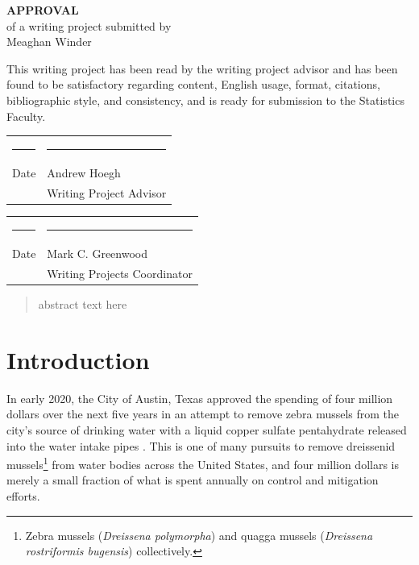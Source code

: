 \documentclass[12pt]{article}\usepackage[]{graphicx}\usepackage[]{color}
\begin{document}
\begin{titlepage}
\null
\begin{center}
{\bf\huge APPROVAL}\\[1.0 in]
of a writing project submitted by\\[.25 in]
Meaghan Winder \\[0.5 in]
\end{center}

\noindent
This writing project has been read by the writing project advisor and
has been found to be satisfactory regarding content, English usage,
format, citations, bibliographic style, and consistency, and is ready
for submission to the Statistics Faculty.

\vspace{.3in}
\begin{center}
\begin{tabular}{ll}
\rule{2.75in}{.03in} & \rule{2.75in}{.03in} \\
Date& Andrew Hoegh \\
& Writing Project Advisor \\
\end{tabular}
\end{center}

\vspace{1cm}

\begin{center}
\begin{tabular}{ll}
\rule{2.75in}{.03in} & \rule{2.75in}{.03in} \\
Date& Mark C. Greenwood \\
& Writing Projects Coordinator \\
\end{tabular}
\end{center}

\end{titlepage}

\newpage
\tableofcontents
\newpage

\begin{abstract}
\noindent abstract text here 
\end{abstract}

\doublespacing

\section{Introduction}

In early 2020, the City of Austin, Texas approved the spending of four million dollars over the next five years in an attempt to remove zebra mussels from the city's source of drinking water with a liquid copper sulfate pentahydrate released into the water intake pipes \cite{CBS:Austin}. This is one of many pursuits to remove dreissenid mussels\footnote{Zebra mussels (\textit{Dreissena polymorpha}) and quagga mussels (\textit{Dreissena rostriformis bugensis}) collectively.} from water bodies across the United States, and four million dollars is merely a small fraction of what is spent annually on control and mitigation efforts.
\end{document}

